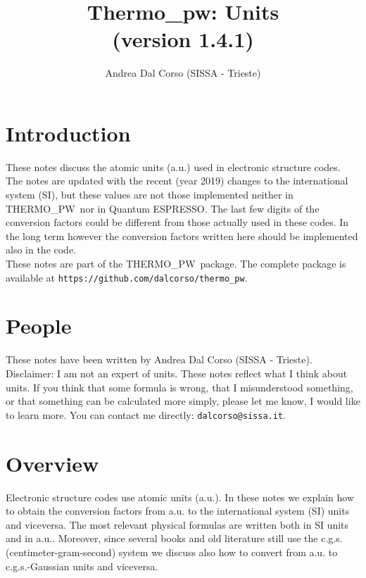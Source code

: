 \documentclass[12pt,a4paper]{article}
\def\version{1.4.1}
\def\qe{{\sc Quantum ESPRESSO}}
\def\tpw{{\sc THERMO\_PW}}
\begin{document}
 
\author{Andrea Dal Corso (SISSA - Trieste)}
\date{}


\title{
  \vskip 1cm
  {\color{red} \Huge Thermo\_pw: Units} \\
  \Large (version \version)
}

\maketitle

\newpage

\tableofcontents

\newpage

\section{\color{coral}Introduction}
These notes discuss the atomic units (a.u.) used in 
electronic structure codes. The notes are updated with the recent 
(year 2019) changes to the international system (SI), but these  
values are not those implemented neither in \tpw\ nor in \qe. The 
last few digits of the conversion factors could be different from 
those actually used in these codes. In the long term however the 
conversion factors written here should be implemented also in the code. \\
These notes are part of the \tpw\ package. The complete package is
available at \texttt{https://github.com/dalcorso/thermo\_pw}.

\newpage
\section{\color{coral}People}
These notes have been written by Andrea Dal Corso (SISSA - Trieste). \\
Disclaimer: I am not an expert of units. 
These notes reflect what I think about units.
If you think that some formula is wrong, that I misunderstood something, or 
that something can be calculated more simply, please let me know, I would 
like to learn more. 
You can contact me directly: \texttt{dalcorso@sissa.it}. 

\newpage
\section{\color{coral}Overview}
Electronic structure codes use atomic units (a.u.). 
In these notes we explain how to obtain the conversion factors 
from a.u. to the international system (SI) units and viceversa. 
The most relevant physical formulas are written both in SI units 
and in a.u.. Moreover, since several books and old literature still 
use the c.g.s. (centimeter-gram-second) system we discuss also how 
to convert from a.u. to c.g.s.-Gaussian units and viceversa.
\end{document}
